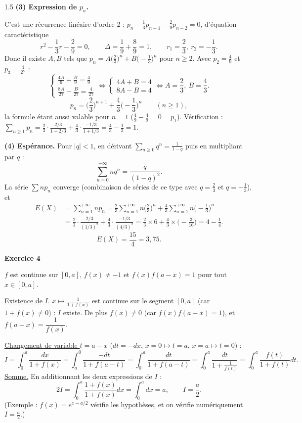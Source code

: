 \documentclass[12pt]{article}
\begin{document}
\begin{spacing}{1.5}
\textbf{(3) Expression de $p_n$.}

C'est une récurrence linéaire d'ordre 2 : $p_n-\frac13p_{n-1}-\frac29p_{n-2}=0$, d'équation caractéristique
\[
r^2-\frac13r-\frac29=0,\qquad\Delta=\frac19+\frac89=1,\qquad r_1=\frac23,\ r_2=-\frac13 .
\]
Donc il existe $A,B$ tels que $p_n=A\big(\frac23\big)^n+B\big(-\frac13\big)^n$ pour $n\ge2$. Avec $p_2=\frac49$ et $p_3=\frac4{27}$ :
\[
\begin{cases}\frac{4A}{9}+\frac{B}{9}=\frac49\\[1mm]\frac{8A}{27}-\frac{B}{27}=\frac4{27}\end{cases}\iff\begin{cases}4A+B=4\\8A-B=4\end{cases}\iff A=\frac23,\ B=\frac43 .
\]
\[
\boxed{p_n=\Big(\frac23\Big)^{n+1}+\frac43\Big(-\frac13\Big)^n}\qquad(n\ge1),
\]
la formule étant aussi valable pour $n=1$ ($\frac49-\frac49=0=p_1$). Vérification : $\sum_{n\ge1}p_n=\frac23\cdot\frac{2/3}{1-2/3}+\frac43\cdot\frac{-1/3}{1+1/3}=\frac43-\frac13=1$.

\textbf{(4) Espérance.} Pour $|q|<1$, en dérivant $\sum_{n\ge0}q^n=\frac{1}{1-q}$ puis en multipliant par $q$ :
\[
\sum_{n=0}^{+\infty}nq^n=\frac{q}{(1-q)^2}.
\]
La série $\sum np_n$ converge (combinaison de séries de ce type avec $q=\frac23$ et $q=-\frac13$), et
\begin{align*}
E(X)&=\sum_{n=1}^{+\infty}np_n=\frac23\sum_{n=1}^{+\infty}n\Big(\frac23\Big)^n+\frac43\sum_{n=1}^{+\infty}n\Big(-\frac13\Big)^n\\
&=\frac23\cdot\frac{2/3}{(1/3)^2}+\frac43\cdot\frac{-1/3}{(4/3)^2}=\frac23\times6+\frac43\times\Big(-\frac{3}{16}\Big)=4-\frac14 .
\end{align*}
\[
\boxed{E(X)=\frac{15}{4}=3{,}75}.
\]

\medskip\textbf{Exercice 4}

$f$ est continue sur $[0,a]$, $f(x)\neq-1$ et $f(x)f(a-x)=1$ pour tout $x\in[0,a]$.

\underline{Existence de $I$.} $x\mapsto\frac1{1+f(x)}$ est continue sur le segment $[0,a]$ (car $1+f(x)\neq0$) : $I$ existe. De plus $f(x)\neq0$ (car $f(x)f(a-x)=1$), et $f(a-x)=\dfrac1{f(x)}$.

\underline{Changement de variable $t=a-x$} ($dt=-dx$, $x=0\mapsto t=a$, $x=a\mapsto t=0$) :
\[
I=\int_0^a\frac{dx}{1+f(x)}=\int_a^0\frac{-dt}{1+f(a-t)}=\int_0^a\frac{dt}{1+f(a-t)}=\int_0^a\frac{dt}{1+\frac1{f(t)}}=\int_0^a\frac{f(t)}{1+f(t)}dt .
\]
\underline{Somme.} En additionnant les deux expressions de $I$ :
\[
2I=\int_0^a\frac{1+f(x)}{1+f(x)}dx=\int_0^adx=a,\qquad\boxed{I=\frac a2}.
\]
(Exemple : $f(x)=e^{x-a/2}$ vérifie les hypothèses, et on vérifie numériquement $I=\frac a2$.)

\end{spacing}
\end{document}
